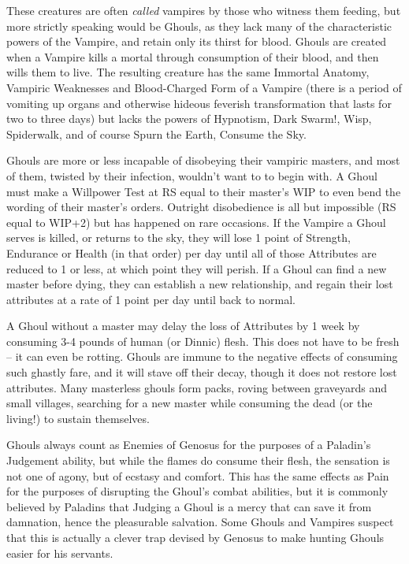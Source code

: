 \documentclass[oneside,11pt,english]{book}
\begin{document}
These creatures are often \emph{called} vampires by those who witness them feeding, but more strictly 
speaking would be Ghouls, as they lack many of the characteristic powers of the Vampire, and 
retain only its thirst for blood. Ghouls are created when a Vampire kills a mortal through 
consumption of their blood, and then wills them to live. The resulting creature has the same 
Immortal Anatomy, Vampiric Weaknesses and Blood-Charged Form of a Vampire (there is a 
period of vomiting up organs and otherwise hideous feverish transformation that lasts for two to 
three days) but lacks the powers of Hypnotism, Dark Swarm!, Wisp, Spiderwalk, and of course 
Spurn the Earth, Consume the Sky. 

Ghouls are more or less incapable of disobeying their vampiric masters, and most of them, 
twisted by their infection, wouldn’t want to to begin with. A Ghoul must make a Willpower Test at 
RS equal to their master’s WIP to even bend the wording of their master’s orders. Outright 
disobedience is all but impossible (RS equal to WIP+2) but has happened on rare occasions. If 
the Vampire a Ghoul serves is killed, or returns to the sky, they will lose 1 point of Strength, 
Endurance or Health (in that order) per day until all of those Attributes are reduced to 1 or less, 
at which point they will perish. If a Ghoul can find a new master before dying, they can establish 
a new relationship, and regain their lost attributes at a rate of 1 point per day until back to 
normal.

A Ghoul without a master may delay the loss of Attributes by 1 week by consuming 3-4 pounds 
of human (or Dinnic) flesh. This does not have to be fresh -- it can even be rotting. Ghouls are 
immune to the negative effects of consuming such ghastly fare, and it will stave off their decay, 
though it does not restore lost attributes. Many masterless ghouls form packs, roving between 
graveyards and small villages, searching for a new master while consuming the dead (or the 
living!) to sustain themselves. 

Ghouls always count as Enemies of Genosus for the purposes of a Paladin’s Judgement ability, 
but while the flames do consume their flesh, the sensation is not one of agony, but of ecstasy 
and comfort. This has the same effects as Pain for the purposes of disrupting the Ghoul’s 
combat abilities, but it is commonly believed by Paladins that Judging a Ghoul is a mercy that 
can save it from damnation, hence the pleasurable salvation. Some Ghouls and Vampires 
suspect that this is actually a clever trap devised by Genosus to make hunting Ghouls easier for 
his servants.
\end{document}
